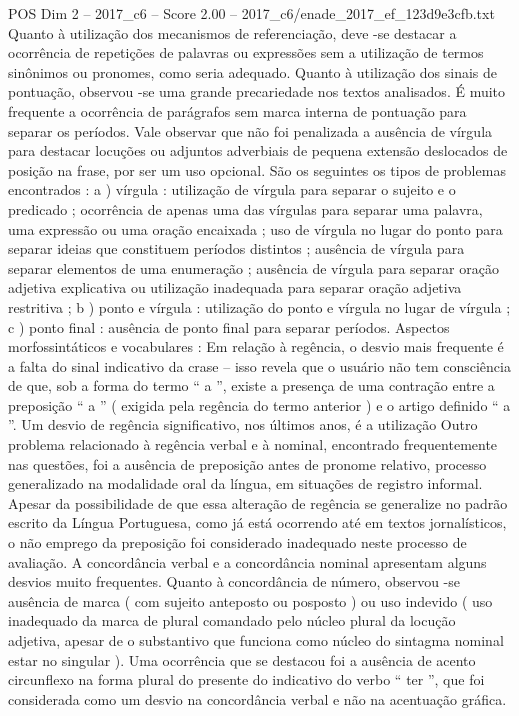 \begin{textsample}{POS Dim 2 – 2017\_c6 – Score 2.00 – 2017\_c6/enade\_2017\_ef\_123d9e3cfb.txt}
Quanto à utilização dos mecanismos de referenciação, deve -se destacar a ocorrência de repetições de palavras ou expressões sem a utilização de termos sinônimos ou pronomes, como seria adequado.
Quanto à utilização dos sinais de pontuação, observou -se uma grande precariedade nos textos analisados.
É muito frequente a ocorrência de parágrafos sem marca interna de pontuação para separar os períodos.
Vale observar que não foi penalizada a ausência de vírgula para destacar locuções ou adjuntos adverbiais de pequena extensão deslocados de posição na frase, por ser um uso opcional.
São os seguintes os tipos de problemas encontrados : a ) vírgula : utilização de vírgula para separar o sujeito e o predicado ; ocorrência de apenas uma das vírgulas para separar uma palavra, uma expressão ou uma oração encaixada ; uso de vírgula no lugar do ponto para separar ideias que constituem períodos distintos ; ausência de vírgula para separar elementos de uma enumeração ; ausência de vírgula para separar oração adjetiva explicativa ou utilização inadequada para separar oração adjetiva restritiva ; b ) ponto e vírgula : utilização do ponto e vírgula no lugar de vírgula ; c ) ponto final : ausência de ponto final para separar períodos.
Aspectos morfossintáticos e vocabulares : Em relação à regência, o desvio mais frequente é a falta do sinal indicativo da crase – isso revela que o usuário não tem consciência de que, sob a forma do termo “ a ”, existe a presença de uma contração entre a preposição “ a ” ( exigida pela regência do termo anterior ) e o artigo definido “ a ”.
Um desvio de regência significativo, nos últimos anos, é a utilização Outro problema relacionado à regência verbal e à nominal, encontrado frequentemente nas questões, foi a ausência de preposição antes de pronome relativo, processo generalizado na modalidade oral da língua, em situações de registro informal.
Apesar da possibilidade de que essa alteração de regência se generalize no padrão escrito da Língua Portuguesa, como já está ocorrendo até em textos jornalísticos, o não emprego da preposição foi considerado inadequado neste processo de avaliação.
A concordância verbal e a concordância nominal apresentam alguns desvios muito frequentes.
Quanto à concordância de número, observou -se ausência de marca ( com sujeito anteposto ou posposto ) ou uso indevido ( uso inadequado da marca de plural comandado pelo núcleo plural da locução adjetiva, apesar de o substantivo que funciona como núcleo do sintagma nominal estar no singular ).
Uma ocorrência que se destacou foi a ausência de acento circunflexo na forma plural do presente do indicativo do verbo “ ter ”, que foi considerada como um desvio na concordância verbal e não na acentuação gráfica.

\end{textsample}
